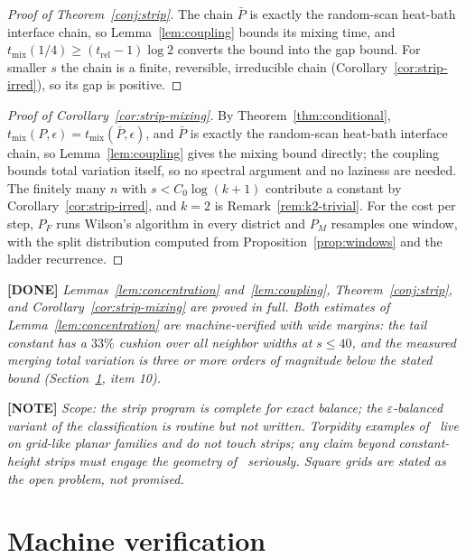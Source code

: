 \documentclass[11pt]{article}
\newcommand{\done}[1]{\medskip\noindent\textcolor{donecol}{\textbf{[DONE]} \emph{#1}}\medskip}
\newcommand{\statusnote}[1]{\medskip\noindent\textcolor{notecol}{\textbf{[NOTE]} \emph{#1}}\medskip}
\begin{document}
\begin{proof}[Proof of Theorem~\ref{conj:strip}]
The chain $\bar P$ is exactly the random-scan heat-bath interface
chain, so Lemma~\ref{lem:coupling} bounds its mixing time, and
$t_{\mathrm{mix}}(1/4) \ge (t_{\mathrm{rel}} - 1) \log 2$ converts the
bound into the gap bound. For smaller $s$ the chain is a finite,
reversible, irreducible chain (Corollary~\ref{cor:strip-irred}), so its
gap is positive.
\end{proof}

\begin{proof}[Proof of Corollary~\ref{cor:strip-mixing}]
By Theorem~\ref{thm:conditional},
$t_{\mathrm{mix}}(P, \epsilon) = t_{\mathrm{mix}}(\bar P, \epsilon)$,
and $\bar P$ is exactly the random-scan heat-bath interface chain, so
Lemma~\ref{lem:coupling} gives the mixing bound directly; the coupling
bounds total variation itself, so no spectral argument and no laziness
are needed. The finitely many $n$ with $s < C_0 \log(k+1)$ contribute a
constant by Corollary~\ref{cor:strip-irred}, and $k = 2$ is
Remark~\ref{rem:k2-trivial}. For the cost per step, $P_F$ runs Wilson's
algorithm in every district and $P_M$ resamples one window, with the
split distribution computed from Proposition~\ref{prop:windows} and the
ladder recurrence.
\end{proof}

\done{Lemmas~\ref{lem:concentration} and~\ref{lem:coupling},
Theorem~\ref{conj:strip}, and Corollary~\ref{cor:strip-mixing} are
proved in full. Both estimates of Lemma~\ref{lem:concentration} are
machine-verified with wide margins: the tail constant has a $33\%$
cushion over all neighbor widths at $s \le 40$, and the measured merging
total variation is three or more orders of magnitude below the stated
bound (Section~\ref{sec:computation}, item 10).}

\statusnote{Scope: the strip program is complete for exact balance; the
$\varepsilon$-balanced variant of the classification is routine but not
written. Torpidity examples of~\cite{charikar2023complexity} live on
grid-\emph{like} planar families and do not touch strips; any claim
beyond constant-height strips must engage the geometry
of~\cite{cannon2024balanced} seriously. Square grids are stated as the
open problem, not promised.}

\section{Machine verification}
\label{sec:computation}
\end{document}
